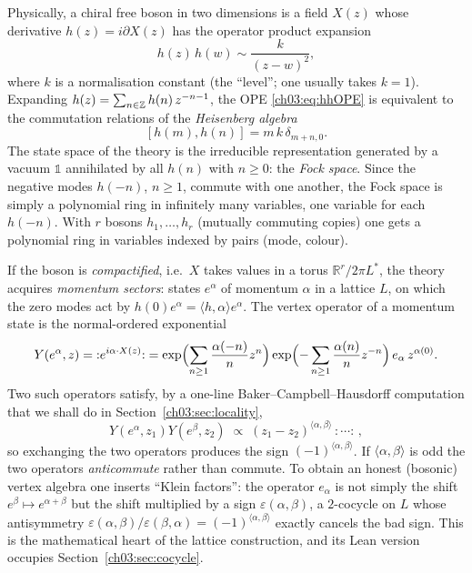 Physically, a chiral free boson in two dimensions is a field $X(z)$ whose derivative
$h(z)=i\partial X(z)$ has the operator product expansion
\begin{equation}\label{ch03:eq:hhOPE}
  h(z)\,h(w)\sim \frac{k}{(z-w)^2},
\end{equation}
where $k$ is a normalisation constant (the ``level''; one usually takes $k=1$). Expanding
$h(z)=\sum_{n\in{\mathbb{Z}}} h(n)\,z^{-n-1}$, the OPE \eqref{ch03:eq:hhOPE} is equivalent to the
commutation relations of the \emph{Heisenberg algebra}
\begin{equation}\label{ch03:eq:heis}
  [h(m),h(n)] = m\,k\,\delta_{m+n,0}.
\end{equation}
The state space of the theory is the irreducible representation generated by a vacuum $\mathbb 1$
annihilated by all $h(n)$ with $n\ge 0$: the \emph{Fock space}. Since the negative modes $h(-n)$,
$n\geq1$, commute with one another, the Fock space is simply a polynomial ring in infinitely many
variables, one variable for each $h(-n)$. With $r$ bosons $h_1,\dots,h_r$ (mutually commuting
copies) one gets a polynomial ring in variables indexed by pairs (mode, colour).

If the boson is \emph{compactified}, i.e.\ $X$ takes values in a torus $\mathbb R^r/2\pi L^*$, the
theory acquires \emph{momentum sectors}: states $e^\alpha$ of momentum $\alpha$ in a lattice $L$,
on which the zero modes act by $h(0)e^\alpha=\langle h,\alpha\rangle e^\alpha$. The vertex operator of
a momentum state is the normal-ordered exponential
\begin{equation}\label{ch03:eq:VOphysical}
  Y(e^\alpha,z) = {:}e^{i\alpha\cdot X(z)}{:}
   = \exp\Bigl(\sum_{n\geq1}\frac{\alpha(-n)}{n}z^{n}\Bigr)
     \exp\Bigl(-\sum_{n\geq1}\frac{\alpha(n)}{n}z^{-n}\Bigr)\,e_\alpha\,z^{\alpha(0)} .
\end{equation}
Two such operators satisfy, by a one-line Baker--Campbell--Hausdorff computation that we shall do
in Section~\ref{ch03:sec:locality},
\begin{equation*}
  Y(e^\alpha,z_1)Y(e^\beta,z_2)\;\propto\;(z_1-z_2)^{\langle\alpha,\beta\rangle}\,{:}\cdots{:}\,,
\end{equation*}
so exchanging the two operators produces the sign $(-1)^{\langle\alpha,\beta\rangle}$. If
$\langle\alpha,\beta\rangle$ is odd the two operators \emph{anticommute} rather than commute. To
obtain an honest (bosonic) vertex algebra one inserts ``Klein factors'': the operator $e_\alpha$ is
not simply the shift $e^\beta\mapsto e^{\alpha+\beta}$ but the shift multiplied by a sign
$\varepsilon(\alpha,\beta)$, a $2$-cocycle on $L$ whose antisymmetry
$\varepsilon(\alpha,\beta)/\varepsilon(\beta,\alpha)=(-1)^{\langle\alpha,\beta\rangle}$ exactly
cancels the bad sign. This is the mathematical heart of the lattice construction, and its Lean
version occupies Section~\ref{ch03:sec:cocycle}.

